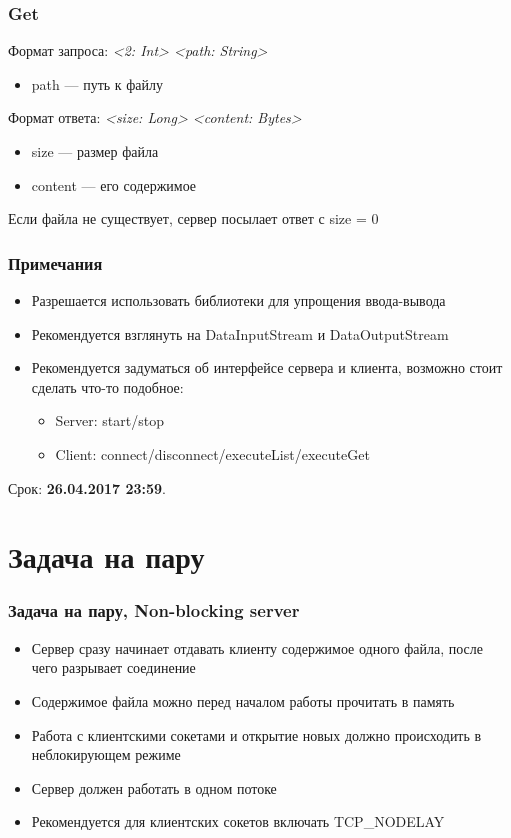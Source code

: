 \documentclass[xetex,mathserif,serif]{beamer}
\begin{document}
	\begin{frame}
		\frametitle{Get}
		Формат запроса: \textit{<2: Int> <path: String>}
		\begin{itemize}
			\item path --- путь к файлу
		\end{itemize}
		
		Формат ответа: \textit{<size: Long> <content: Bytes>}
		\begin{itemize}
			\item size --- размер файла
			\item content --- его содержимое
		\end{itemize}
		Если файла не существует, сервер посылает ответ с size = 0
	\end{frame}

	\begin{frame}
		\frametitle{Примечания}
		\begin{itemize}
			\item Разрешается использовать библиотеки для упрощения ввода-вывода
			\item Рекомендуется взглянуть на DataInputStream и DataOutputStream
			\item Рекомендуется задуматься об интерфейсе сервера и клиента, возможно стоит сделать что-то подобное:
			\begin{itemize}
				\item Server: start/stop
				\item Client: connect/disconnect/executeList/executeGet
			\end{itemize}
		\end{itemize}
		Срок: \textbf{26.04.2017 23:59}.
	\end{frame}

	\section{Задача на пару}

	\begin{frame}
		\frametitle{Задача на пару, Non-blocking server}
		\begin{itemize}
			\item Сервер сразу начинает отдавать клиенту содержимое одного файла, после чего разрывает соединение
			\item Содержимое файла можно перед началом работы прочитать в память
			\item Работа с клиентскими сокетами и открытие новых должно происходить в неблокирующем режиме
			\item Сервер должен работать в одном потоке 
			\item Рекомендуется для клиентских сокетов включать TCP\_NODELAY
		\end{itemize}
	\end{frame}
\end{document}
